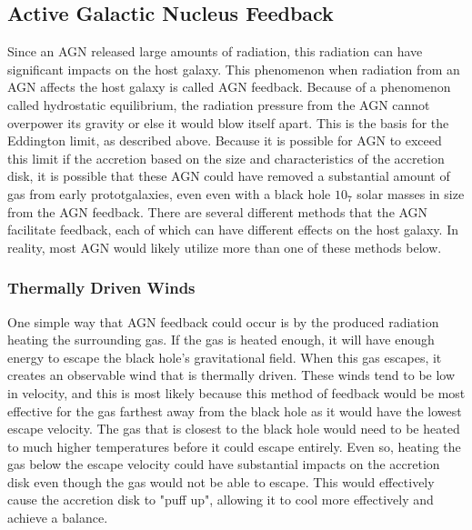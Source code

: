 \documentclass[12pt]{article}
\begin{document}
\subsection{Active Galactic Nucleus Feedback}
Since an AGN released large amounts of radiation, this radiation can have
significant impacts on the host galaxy.  This phenomenon when radiation from an
AGN affects the host galaxy is called AGN feedback.  Because of a phenomenon
called
hydrostatic equilibrium, the radiation pressure from the AGN cannot overpower
its gravity or else it would blow itself apart. This is the basis for the
Eddington limit, as described above.  Because it is possible for AGN to exceed
this limit if the accretion based on the size and characteristics of the
accretion disk, it is possible that these AGN could have removed a substantial
amount of gas from early prototgalaxies, even even with a black hole $10_7$
solar masses in size from the AGN feedback.  There are several different methods
that the AGN facilitate feedback, each of which can have different effects on
the host galaxy.  In reality, most AGN would likely utilize more than one of
these methods below.

    \subsubsection{Thermally Driven Winds}
    One simple way that AGN feedback could occur is by the produced radiation
    heating the surrounding gas.  If the gas is heated enough, it will have
    enough energy to escape the black hole's gravitational field.  When this gas
    escapes, it creates an observable wind that is thermally driven.  These
    winds tend to be low in velocity, and this is most likely because this
    method of feedback would be most effective for the gas farthest away from
    the black hole as it would have the lowest escape velocity.  The gas that is
    closest to the black hole would need to be heated to much higher
    temperatures before it could escape entirely.  Even so, heating the gas
    below the escape velocity could have substantial impacts on the accretion
    disk even though the gas would not be able to escape.  This would
    effectively cause the accretion disk to "puff up", allowing it to cool more
    effectively and achieve a balance.
\end{document}
